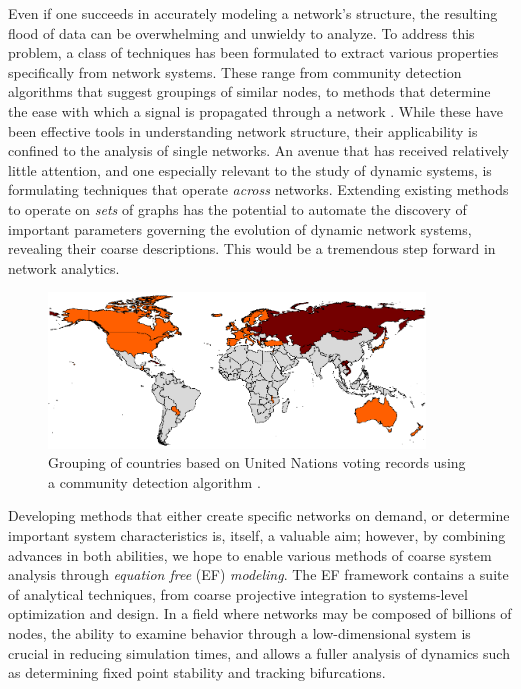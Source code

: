 \documentclass[11pt]{article}
\begin{document}
\indent Even if one succeeds in accurately modeling a network's structure, the resulting flood of data can be overwhelming and unwieldy to analyze. To address this problem, a class of techniques has been formulated to extract various properties specifically from network systems. These range from community detection algorithms that suggest groupings of similar nodes, to methods that determine the ease with which a signal is propagated through a network \cite{Kleinberg1999} \cite{Newman2004} \cite{Latora2001}. While these have been effective tools in understanding network structure, their applicability is confined to the analysis of single networks. An avenue that has received relatively little attention, and one especially relevant to the study of dynamic systems, is formulating techniques that operate \textit{across} networks. Extending existing methods to operate on \textit{sets} of graphs has the potential to automate the discovery of important parameters governing the evolution of dynamic network systems, revealing their coarse descriptions. This would be a tremendous step forward in network analytics.\vspace{1mm}\\
\begin{figure}[h!]
  \centering
  \includegraphics[width=10cm]{unCommunityDetection}
  \caption{Grouping of countries based on United Nations voting records using a community detection algorithm \cite{Macon2012a}.}
  \label{fig:un}
\end{figure}
\indent Developing methods that either create specific networks on demand, or determine important system characteristics is, itself, a valuable aim; however, by combining advances in both abilities, we hope to enable various methods of coarse system analysis through \textit{equation free} (EF) \textit{modeling}. The EF framework contains a suite of analytical techniques, from coarse projective integration to systems-level optimization and design. In a field where networks may be composed of billions of nodes, the ability to examine behavior through a low-dimensional system is crucial in reducing simulation times, and allows a fuller analysis of dynamics such as determining fixed point stability and tracking bifurcations.\vspace{1mm}\\
\end{document}
